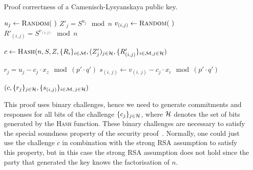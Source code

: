 \begin{algorithm}
  \caption{Proof correctness of a Camenisch-Lysyanskaya public key.}
  \label{alg:CL-prove-key}
  \addtolength{\baselineskip}{1mm}
  \begin{algorithmic}[1]
        \State $u_j \gets \Call{Random}{~}$
        \State $Z'_j = S^{u_j} \mod n$
          \State $v_{(i,j)} \gets \Call{Random}{~}$
          \State $R'_{(i,j)} = S^{v_{(i,j)}} \mod n$
        \EndFor
      \EndFor

      \State $c \gets \Call{Hash}{n, S, Z, \{R_i\}_{i \in \M}, (Z'_j)_{j \in \H}, \{R'_{(i, j)}\}_{i \in \M, j \in \H}}$

        \State $r_j = u_j - c_j \cdot x_z \mod (p' \cdot q')$
          \State $s_{(i,\, j)} \gets v_{(i,\, j)} - c_j \cdot x_i \mod (p' \cdot q')$
        \EndFor
      \EndFor

      \Return $(c, \{r_j\}_{j \in \mathcal{H}}, \{s_{(i, j)}\}_{i \in \mathcal{M},\, j \in \mathcal{H}})$
    \EndFunction
  \end{algorithmic}
\end{algorithm}

This proof uses binary challenges, hence we need to generate commitments and
responses for all bits of the challenge $\{c_j\}_{j \in \mathcal{H}}$, where $\mathcal{H}$
denotes the set of bits generated by the \textsc{Hash} function. These binary
challenges are necessary to satisfy the special soundness property of the
security proof~\cite[Section~3.5]{Camenisch2007}. Normally, one could just use
the challenge $c$ in combination with the strong RSA assumption to satisfy this
property, but in this case the strong RSA assumption does not hold since the
party that generated the key knows the factorisation of $n$.

%
%


